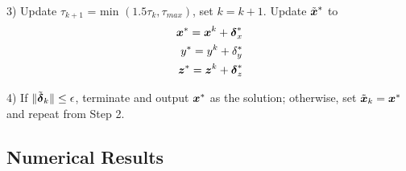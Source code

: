 {{%

3) Update  $\tau_{k+1} $ = min $(1.5\tau_k, \tau_{max})$, set $k = k+1$. Update $\tilde{\mbox{\boldmath$x$}}^{*}$ to
\setcounter{abc}{0}
\begin{eqnarray} 
\nonumber
\mbox{\boldmath$x$}^{*} = \mbox{\boldmath$x$}^k + \mbox{\boldmath${\delta}$}_x^* \\
\nonumber
y^{*} = y^k + \delta_y^* \\
\nonumber
\mbox{\boldmath$z$}^{*} = \mbox{\boldmath$z$}^k + \mbox{\boldmath${\delta}$}_z^*
\end{eqnarray}


4) If $\|\tilde{\mbox{\boldmath${\delta}$}}_k\| \leq \epsilon$, terminate and output $\mbox{\boldmath$x$}^*$ as the solution; otherwise, set $\tilde{\mbox{\boldmath$x$}}_{k} = \mbox{\boldmath$x$}^{*}$  and repeat from Step 2. 

\phantom{m}
}
}

\subsection{Numerical Results}

